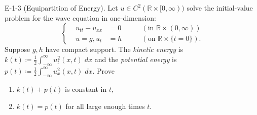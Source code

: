 \documentclass{article}
\begin{document}
	\begin{prb}{E-1-3}
		(Equipartition of Energy). Let $u \in C^{2}(\mathbb{R} \times [0,\infty))$ solve the initial-value problem for the wave equation in one-dimension: 
		\begin{equation*}
			\left\{
			\begin{alignedat}{3}
				&u_{tt} - u_{xx} &=0 \qquad &(\text{in } \mathbb{R} \times (0,\infty)) \\
				&u=g, u_t &= h \qquad &(\text{on } \mathbb{R} \times \{t = 0\}).
			\end{alignedat}
			\right. 
		\end{equation*} 
		Suppose $g,h$ have compact support. The \textit{kinetic energy} is $k(t) \coloneqq \frac{1}{2}\int_{-\infty}^{\infty}u_t^2(x,t)\;dx$ and the \textit{potential energy} is $p(t) \coloneqq \frac{1}{2}\int_{-\infty}^{\infty}u_x^2(x,t)\;dx$. Prove \vspace{-0.25cm}
		\begin{enumerate}[itemsep =-2pt,label =(\roman{*})]
			\item $k(t) + p(t)$ is constant in $t$, 
			\item $k(t) = p(t)$ for all large enough times $t$. 
		\end{enumerate}
	\end{prb}
\end{document}
